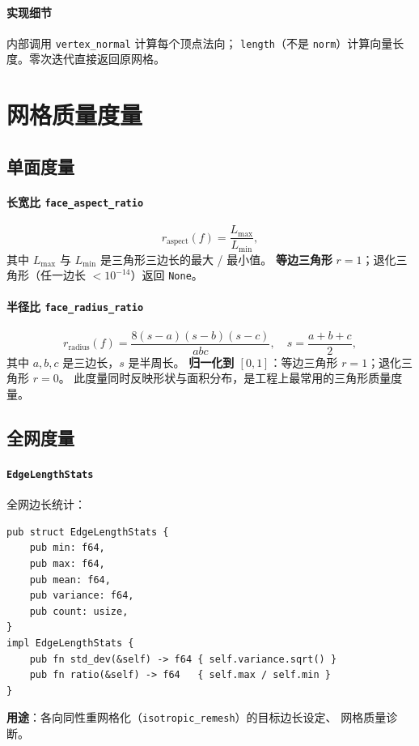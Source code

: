 \documentclass[11pt,a4paper]{article}
\begin{document}
\paragraph{实现细节} 内部调用 \texttt{vertex\_normal} 计算每个顶点法向；
\texttt{length}（不是 \texttt{norm}）计算向量长度。零次迭代直接返回原网格。

\section{网格质量度量}

\subsection{单面度量}

\paragraph{长宽比 \texttt{face\_aspect\_ratio}}
\[
  r_{\text{aspect}}(f) = \frac{L_{\max}}{L_{\min}},
\]
其中 $L_{\max}$ 与 $L_{\min}$ 是三角形三边长的最大 / 最小值。
\textbf{等边三角形} $r = 1$；退化三角形（任一边长 $< 10^{-14}$）返回 \texttt{None}。

\paragraph{半径比 \texttt{face\_radius\_ratio}}
\[
  r_{\text{radius}}(f) = \frac{8(s-a)(s-b)(s-c)}{abc}, \quad
  s = \frac{a+b+c}{2},
\]
其中 $a, b, c$ 是三边长，$s$ 是半周长。
\textbf{归一化到 $[0, 1]$}：等边三角形 $r = 1$；退化三角形 $r = 0$。
此度量同时反映形状与面积分布，是工程上最常用的三角形质量度量。

\subsection{全网度量}

\paragraph{\texttt{EdgeLengthStats}} 全网边长统计：
\begin{lstlisting}
pub struct EdgeLengthStats {
    pub min: f64,
    pub max: f64,
    pub mean: f64,
    pub variance: f64,
    pub count: usize,
}
impl EdgeLengthStats {
    pub fn std_dev(&self) -> f64 { self.variance.sqrt() }
    pub fn ratio(&self) -> f64   { self.max / self.min }
}
\end{lstlisting}
\textbf{用途}：各向同性重网格化（\texttt{isotropic\_remesh}）的目标边长设定、
网格质量诊断。
\end{document}
